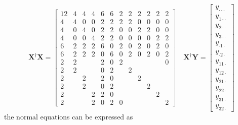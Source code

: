 \documentclass{article}
\begin{document}
\begin{equation*}
\mathbf{X}^{\dagger }\mathbf{X}=\left[ 
\begin{array}{cccccccccccc}
12 & 4 & 4 & 4 & 6 & 6 & 2 & 2 & 2 & 2 & 2 & 2 \\ 
4 & 4 & 0 & 0 & 2 & 2 & 2 & 2 & 0 & 0 & 0 & 0 \\ 
4 & 0 & 4 & 0 & 2 & 2 & 0 & 0 & 2 & 2 & 0 & 0 \\ 
4 & 0 & 0 & 4 & 2 & 2 & 0 & 0 & 0 & 0 & 2 & 2 \\ 
6 & 2 & 2 & 2 & 6 & 0 & 2 & 0 & 2 & 0 & 2 & 0 \\ 
6 & 2 & 2 & 2 & 0 & 6 & 0 & 2 & 0 & 2 & 0 & 2 \\ 
2 & 2 &  &  & 2 & 0 & 2 &  &  &  &  & 0 \\ 
2 & 2 &  &  & 0 & 2 &  & 2 &  &  &  &  \\ 
2 &  & 2 &  & 2 & 0 &  &  & 2 &  &  &  \\ 
2 &  & 2 &  & 0 & 2 &  &  &  & 2 &  &  \\ 
2 &  &  & 2 & 2 & 0 &  &  &  &  & 2 &  \\ 
2 &  &  & 2 & 0 & 2 & 0 &  &  &  &  & 2%
\end{array}%
\right] \quad \mathbf{X}^{\dagger }\mathbf{Y}=\left[ 
\begin{array}{c}
y_{\cdot \cdot \cdot } \\ 
y_{1\cdot \cdot } \\ 
y_{2\cdot \cdot } \\ 
y_{3\cdot \cdot } \\ 
y_{\cdot 1\cdot } \\ 
y_{\cdot 2\cdot } \\ 
y_{11\cdot } \\ 
y_{12\cdot } \\ 
y_{21\cdot } \\ 
y_{22\cdot } \\ 
y_{31\cdot } \\ 
y_{32\cdot }%
\end{array}%
\right] 
\end{equation*}%
the normal equations can be expressed as%
\end{document}
